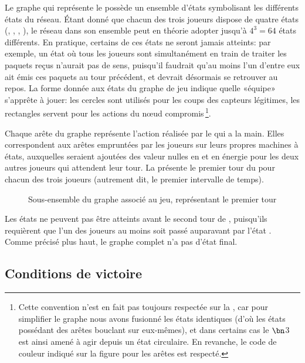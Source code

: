 Le graphe qui représente le  possède un ensemble d'états symbolisant les différents états du réseau.
Étant donné que chacun des trois joueurs dispose de quatre états (\idle, \send, \listen, \treatmsg), le réseau dans son ensemble peut en théorie adopter jusqu'à $4^3=64$ états différents.
En pratique, certains de ces états ne seront jamais atteints: par exemple, un état où tous les joueurs sont simultanément en train de traiter les paquets reçus n'aurait pas de sens, puisqu'il faudrait qu'au moins l'un d'entre eux ait émis ces paquets au tour précédent, et devrait désormais se retrouver au repos.
La forme donnée aux états du graphe de jeu indique quelle «équipe» s'apprête à jouer: les cercles sont utilisés pour les coups des capteurs légitimes, les rectangles servent pour les actions du nœud compromis\,\footnote{Cette convention n'est en fait pas toujours respectée sur la , car pour simplifier le graphe nous avons fusionné les états identiques (d'où les états possédant des arêtes bouclant sur eux-mêmes), et dans certains cas le  $\bn$3 est ainsi amené à agir depuis un état circulaire. En revanche, le code de couleur indiqué sur la figure pour les arêtes est respecté.}.

Chaque arête du graphe représente l'action réalisée par le  qui a la main.
Elles correspondent aux arêtes empruntées par les joueurs sur leurs propres machines à états, auxquelles seraient ajoutées des valeur nulles en  et en énergie pour les deux autres joueurs qui attendent leur tour.
La  présente le premier tour du  pour chacun des trois joueurs (autrement dit, le premier intervalle de temps).
\begin{figure}[p]
    \centering
    
    \caption{Sous-ensemble du graphe associé au jeu, représentant le premier tour}\label{tj:fig:autFirstTurn}
\end{figure}
Les états \treatmsg ne peuvent pas être atteints avant le second tour de , puisqu'ils requièrent que l'un des joueurs au moins soit passé auparavant par l'état \listen.
Comme précisé plus haut, le graphe complet n'a pas d'état final.

    \subsection{Conditions de victoire}

